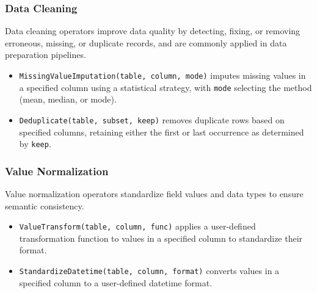 \subsubsection{Data Cleaning}
Data cleaning operators improve data quality by detecting, fixing, or removing erroneous, missing, or duplicate records, and are commonly applied in data preparation pipelines.
%
\begin{itemize}[leftmargin=*]
    \item \texttt{MissingValueImputation(table, column, mode)} imputes missing values in a specified column using a statistical strategy, with \texttt{mode} selecting the method (\eg mean, median, or mode).
    \item \texttt{Deduplicate(table, subset, keep)} removes duplicate rows based on specified columns, retaining either the first or last occurrence as determined by \texttt{keep}.
\end{itemize}

\subsubsection{Value Normalization}
Value normalization operators standardize field values and data types to ensure semantic consistency.
%
\begin{itemize}[leftmargin=*]
    \item \texttt{ValueTransform(table, column, func)} applies a user-defined transformation function to values in a specified column to standardize their format.
    \item \texttt{StandardizeDatetime(table, column, format)} converts values in a specified column to a user-defined datetime format.
\end{itemize}

